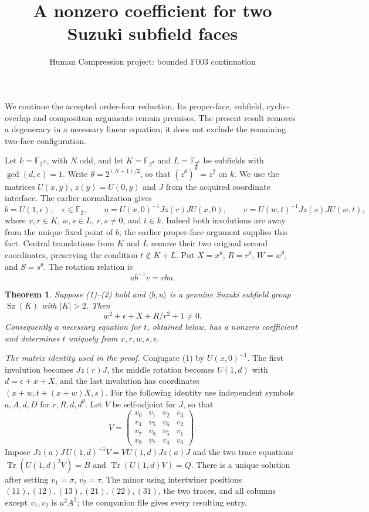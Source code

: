 \documentclass[11pt,a4paper]{article}
\title{A nonzero coefficient for two Suzuki subfield faces}
\author{Human Compression project: bounded F003 continuation}\date{}
\newtheorem{theorem}{Theorem}
\newcommand{\Sz}{\operatorname{Sz}}
\begin{document}
\maketitle
We continue the accepted order-four reduction. Its proper-face,
subfield, cyclic-overlap and compositum arguments remain premises.
The present result removes a degeneracy in a necessary linear equation;
it does not exclude the remaining two-face configuration.

Let $k=\mathbb F_{2^N}$, with $N$ odd, and let
$K=\mathbb F_{2^d}$ and $L=\mathbb F_{2^e}$ be subfields with
$\gcd(d,e)=1$. Write $\theta=2^{(N+1)/2}$, so that
$(z^\theta)^\theta=z^2$ on $k$. We use the matrices $U(x,y)$,
$z(y)=U(0,y)$ and $J$ from the acquired coordinate interface.
The earlier normalization gives
\[
 b=U(1,\epsilon),\quad \epsilon\in\mathbb F_2,\qquad
 u=U(x,0)^{-1}Jz(r)JU(x,0),\qquad
 v=U(w,t)^{-1}Jz(s)JU(w,t),                    \tag{1}
\]
where $x,r\in K$, $w,s\in L$, $r,s\ne0$, and $t\in k$.
Indeed both involutions are away from the unique fixed point of $b$;
the earlier proper-face argument supplies this fact. Central translations
from $K$ and $L$ remove their two original second coordinates, preserving
the condition $t\notin K+L$. Put
$X=x^\theta$, $R=r^\theta$, $W=w^\theta$, and $S=s^\theta$.
The rotation relation is
\[
                 u b^{-1}v=vbu.                         \tag{2}
\]

\begin{theorem}
Suppose (1)--(2) hold and $\langle b,u\rangle$ is a genuine Suzuki
subfield group $\Sz(K)$ with $|K|>2$. Then
\[
                 w^2+\epsilon+X+R/r^2+1\ne0.             \tag{3}
\]
Consequently a necessary equation for $t$, obtained below, has a
nonzero coefficient and determines $t$ uniquely from $x,r,w,s,\epsilon$.
\end{theorem}

\noindent\emph{The matrix identity used in the proof.}
Conjugate (1) by $U(x,0)^{-1}$. The first involution becomes $Jz(r)J$,
the middle rotation becomes $U(1,d)$ with
$d=\epsilon+x+X$, and the last involution has coordinates
$(x+w,t+(x+w)X,s)$. For the following identity use independent symbols
$a,A,d,D$ for $r,R,d,d^\theta$.
Let $V$ be self-adjoint for $J$, so that
\[
 V=\begin{pmatrix}
 v_0&v_1&v_2&v_3\\v_4&v_5&v_6&v_2\\
 v_7&v_8&v_5&v_1\\v_9&v_7&v_4&v_0
 \end{pmatrix}.
\]
Impose $Jz(a)J\,U(1,d)^{-1}V=VU(1,d)Jz(a)J$ and the two trace
equations $\operatorname{Tr}(U(1,d)^2V)=B$ and
$\operatorname{Tr}(U(1,d)V)=Q$. There is a unique solution after setting
$v_1=\sigma$, $v_2=\tau$. The minor using intertwiner positions $(11),(12),(13),(21),(22),(31)$,
the two traces, and all columns except $v_1,v_2$ is $a^2A^2$; the companion file gives every resulting entry.
\end{document}
